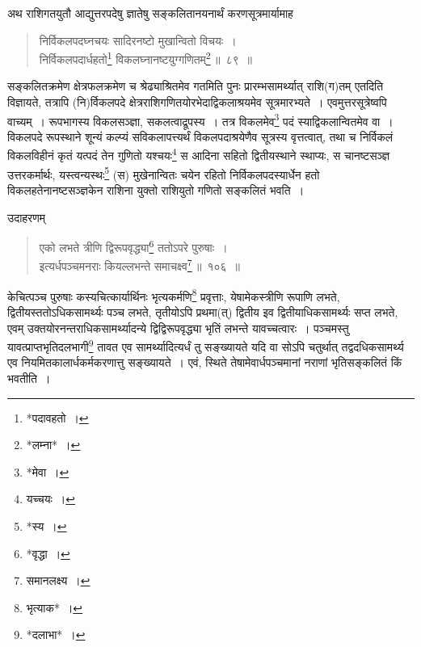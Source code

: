 \documentclass[10pt, openany]{book}
\begin{document}
{{{{{{{{अथ राशिगतयुतौ आद्युत्तरपदेषु ज्ञातेषु सङ्कलितानयनार्थं
करणसूत्रमार्यामाह\textendash}

 \label{89}
\begin{quote}
    
{\bs निर्विकलपदघ्नचयः सादिरनष्टो मुखान्वितो विचयः~।\\
 निर्विकलपदार्धहतो\renewcommand{\thefootnote}{१३}\footnote{*पदावहतो~।}  विकलघ्नानष्टयुग्गणितम्\renewcommand{\thefootnote}{१४}\footnote{*लम्ना*~।}\,॥~८९~॥}\end{quote}

\newpage

{सङ्कलितक्रमेण क्षेत्रफलक्रमेण च श्रेढ्याश्रितमेव गतमिति पुनः
प्रारम्भसामर्थ्यात्}
{राशि(ग)तम् एतदिति विज्ञायते, तत्रापि (नि)र्विकलपदे
क्षेत्रराशिगणितयोरभेदाद्विकलाश्रयमेव}
{सूत्रमारभ्यते~। एवमुत्तरसूत्रेष्वपि वाच्यम्~। रूपभागस्य विकलसञ्ज्ञा,
सकलत्वाद्रूपस्य~। तत्र}
{विकलमेव\renewcommand{\thefootnote}{१}\footnote{*मेवा~।} पदं स्याद्विकलान्वितमेव वा~। विकलपदे रूपस्थाने शून्यं
कल्प्यं सविकलापत्त्यर्थं}
{विकलपदाश्रयेणैव सूत्रस्य वृत्तत्वात्, तथा च निर्विकलं विकलविहीनं कृतं
यत्पदं तेन गुणितो}
{यश्चयः\renewcommand{\thefootnote}{२}\footnote{यच्चयः~।}  स आदिना सहितो द्वितीयस्थाने स्थाप्यः, स चानष्टसञ्ज्ञ
उत्तरकर्मार्थः, यस्त्वन्यस्थः\renewcommand{\thefootnote}{३}\footnote{*स्य~।}}
{(स) मुखेनान्वितः चयेन रहितो निर्विकलपदस्यार्धेन हतो
विकलहतेनानष्टसञ्ज्ञकेन राशिना}
{युक्तो राशियुतो गणितो सङ्कलितं भवति~।}
\vspace{3mm}

 {उदाहरणम्\textendash}

\begin{quote}
    
{\eg एको लभते त्रीणि द्विरूपवृद्ध्या\renewcommand{\thefootnote}{४}\footnote{*वृद्धा~।}  ततोऽपरे पुरुषाः~।\\
 इत्यर्धपञ्चमनराः कियल्लभन्ते समाचक्ष्व\renewcommand{\thefootnote}{५}\footnote{समानलक्ष्य~।}\,॥~१०६~॥}\end{quote}

 {केचित्पञ्च पुरुषाः कस्यचित्कार्यार्थिनः भृत्यकर्मणि\renewcommand{\thefootnote}{६}\footnote{भृत्याक*~।}  प्रवृत्ताः,
येषामेकस्त्रीणि रूपाणि}
{लभते, द्वितीयस्ततोऽधिकसामर्थ्यः पञ्च लभते, तृतीयोऽपि प्रथमा(त्) द्वितीय
इव द्वितीयाधिकसामर्थ्यः सप्त लभते, एवम् उक्तयोरनन्तराधिकसामर्थ्यादन्ये
द्विद्विरूपवृद्ध्या भृतिं लभन्ते}
{यावच्चत्वारः~। पञ्चमस्तु यावत्प्राप्तभृतिदलभागी\renewcommand{\thefootnote}{७}\footnote{*दलाभा*~।} तावत एव
सामर्थ्यादित्यर्धं तु सङ्ख्यायते}
{यदि वा सोऽपि चतुर्थात् तद्वदधिकसामर्थ्य एव नियमितकालार्धकर्मकरणात्तु
सङ्ख्यायते~। एवं,}
{स्थिते तेषामेवार्धपञ्चमानां नराणां भृतिसङ्कलितं किं भवतीति~।}
\vspace{2mm}

}}}}}}}
\end{document}
